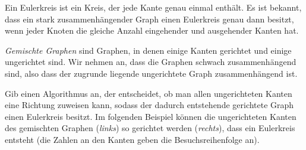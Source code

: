 \documentclass{uebung_cs}
\begin{document}
\newpage
\begin{exercise}
    Ein Eulerkreis ist ein Kreis, der jede Kante genau einmal enthält.
    Es ist bekannt, dass ein stark zusammenhängender Graph einen Eulerkreis genau dann besitzt, wenn jeder Knoten die gleiche Anzahl eingehender und ausgehender Kanten hat.

	\emph{Gemischte Graphen} sind Graphen, in denen einige Kanten gerichtet und einige ungerichtet sind. Wir nehmen an, dass die Graphen schwach zusammenhängend sind, also dass der zugrunde liegende ungerichtete Graph zusammenhängend ist. 
    
    Gib einen Algorithmus an, der entscheidet, ob man allen ungerichteten Kanten eine Richtung zuweisen kann, sodass der dadurch entstehende gerichtete Graph einen Eulerkreis besitzt. Im folgenden Beispiel können die ungerichteten Kanten des gemischten Graphen (\emph{links}) so gerichtet werden (\emph{rechts}), dass ein Eulerkreis entsteht (die Zahlen an den Kanten geben die Besuchsreihenfolge an).

    \begin{figure}[ht]
    	\begin{minipage}[b]{0.5\textwidth}
    		\centering
    	\end{minipage}
    	\begin{minipage}[b]{0.5\textwidth}
    		\centering
\end{minipage}
\end{figure}
\end{exercise}
\end{document}
